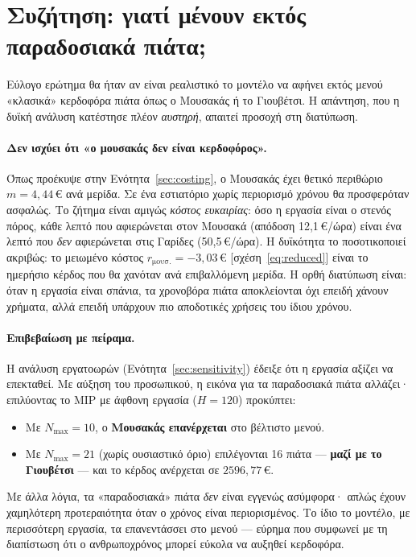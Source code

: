 \documentclass[11pt,a4paper]{article}
\newcommand{\en}[1]{\textenglish{#1}}
\begin{document}
\section{Συζήτηση: γιατί μένουν εκτός παραδοσιακά πιάτα;}\label{sec:discussion}
Εύλογο ερώτημα θα ήταν αν είναι ρεαλιστικό το μοντέλο να αφήνει εκτός μενού «κλασικά»
κερδοφόρα πιάτα όπως ο Μουσακάς ή το Γιουβέτσι. Η απάντηση, που η δυϊκή ανάλυση
κατέστησε πλέον \emph{αυστηρή}, απαιτεί προσοχή στη διατύπωση.

\paragraph{Δεν ισχύει ότι «ο μουσακάς δεν είναι κερδοφόρος».} Όπως προέκυψε στην
Ενότητα~\ref{sec:costing}, ο Μουσακάς έχει θετικό περιθώριο $m=4{,}44$\,€ ανά μερίδα.
Σε ένα εστιατόριο χωρίς περιορισμό χρόνου θα προσφερόταν ασφαλώς. Το ζήτημα είναι
αμιγώς \emph{κόστος ευκαιρίας}: όσο η εργασία είναι ο στενός πόρος, κάθε λεπτό που
αφιερώνεται στον Μουσακά (απόδοση 12,1\,€/ώρα) είναι ένα λεπτό που \emph{δεν}
αφιερώνεται στις Γαρίδες (50,5\,€/ώρα). Η δυϊκότητα το ποσοτικοποιεί ακριβώς: το
μειωμένο κόστος $r_{\text{μουσ.}}=-3{,}03$\,€ [σχέση~\eqref{eq:reduced}] είναι το
ημερήσιο κέρδος που θα χανόταν ανά επιβαλλόμενη μερίδα. Η ορθή διατύπωση είναι: όταν
η εργασία είναι σπάνια, τα χρονοβόρα πιάτα αποκλείονται όχι επειδή χάνουν χρήματα,
αλλά επειδή υπάρχουν πιο αποδοτικές χρήσεις του ίδιου χρόνου.

\paragraph{Επιβεβαίωση με πείραμα.} Η ανάλυση εργατοωρών (Ενότητα~\ref{sec:sensitivity})
έδειξε ότι η εργασία αξίζει να επεκταθεί. Με αύξηση του προσωπικού, η εικόνα για τα
παραδοσιακά πιάτα αλλάζει· επιλύοντας το \en{MIP} με άφθονη εργασία ($H=120$)
προκύπτει:
\begin{itemize}
  \item Με $N_{\max}=10$, ο \textbf{Μουσακάς επανέρχεται} στο βέλτιστο μενού.
  \item Με $N_{\max}=21$ (χωρίς ουσιαστικό όριο) επιλέγονται 16 πιάτα — \textbf{μαζί
  με το Γιουβέτσι} — και το κέρδος ανέρχεται σε $2596{,}77$\,€.
\end{itemize}
Με άλλα λόγια, τα «παραδοσιακά» πιάτα \emph{δεν} είναι εγγενώς ασύμφορα· απλώς έχουν
χαμηλότερη προτεραιότητα όταν ο χρόνος είναι περιορισμένος. Το ίδιο το μοντέλο, με
περισσότερη εργασία, τα επανεντάσσει στο μενού — εύρημα που συμφωνεί με τη διαπίστωση
ότι ο ανθρωποχρόνος μπορεί εύκολα να αυξηθεί κερδοφόρα.
\end{document}
